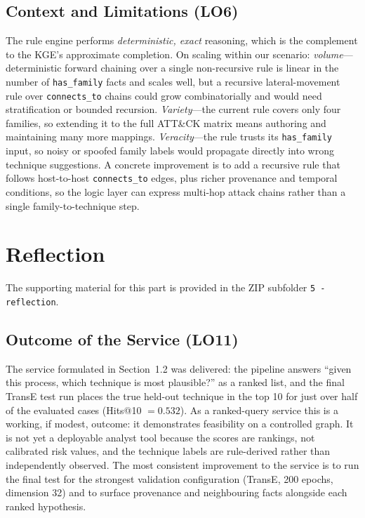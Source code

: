\documentclass{article}
\begin{document}
\subsection{Context and Limitations (LO6)}
The rule engine performs \emph{deterministic, exact} reasoning, which is the
complement to the KGE's approximate completion. On scaling within our scenario:
\emph{volume}---deterministic forward chaining over a single non-recursive rule
is linear in the number of \texttt{has\_family} facts and scales well, but a
recursive lateral-movement rule over \texttt{connects\_to} chains could grow
combinatorially and would need stratification or bounded recursion.
\emph{Variety}---the current rule covers only four families, so extending it to
the full ATT\&CK matrix means authoring and maintaining many more mappings.
\emph{Veracity}---the rule trusts its \texttt{has\_family} input, so noisy or
spoofed family labels would propagate directly into wrong technique
suggestions. A concrete improvement is to add a recursive rule that follows
host-to-host \texttt{connects\_to} edges, plus richer provenance and temporal
conditions, so the logic layer can express multi-hop attack chains rather than a
single family-to-technique step.

\section{Reflection}
The supporting material for this part is provided in the ZIP subfolder
\texttt{5 - reflection}.

\subsection{Outcome of the Service (LO11)}
The service formulated in Section~1.2 was delivered: the pipeline answers
``given this process, which technique is most plausible?'' as a ranked list, and
the final TransE test run places the true held-out technique in the top 10 for
just over half of the evaluated cases (Hits@10 $= 0.532$). As a ranked-query
service this is a working, if modest, outcome: it demonstrates feasibility on a
controlled graph. It is not yet a deployable analyst tool because the scores are
rankings, not calibrated risk values, and the technique labels are rule-derived
rather than independently observed. The most consistent improvement to the
service is to run the final test for the strongest validation configuration
(TransE, 200 epochs, dimension 32) and to surface provenance and neighbouring
facts alongside each ranked hypothesis.
\end{document}
